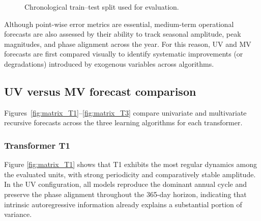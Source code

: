 \begin{figure}[!h]
\centering
\begin{subfigure}[t]{\columnwidth}
    \centering
    
\end{subfigure}\par\vspace{0.15cm}
\begin{subfigure}[t]{\columnwidth}
    \centering
    
\end{subfigure}\par\vspace{0.15cm}
\begin{subfigure}[t]{\columnwidth}
    \centering
    
\end{subfigure}
\caption{Chronological train--test split used for evaluation.}
\label{fig:split_all}
\end{figure}

Although point-wise error metrics are essential, medium-term operational forecasts are also assessed by their ability to track seasonal amplitude, peak magnitudes, and phase alignment across the year. For this reason, UV and MV forecasts are first compared visually to identify systematic improvements (or degradations) introduced by exogenous variables across algorithms.

\subsection{UV versus MV forecast comparison}
\label{subsec:results_uv_mv_visual}

Figures~\ref{fig:matrix_T1}--\ref{fig:matrix_T3} compare univariate and multivariate recursive forecasts across the three learning algorithms for each transformer.

\subsubsection{Transformer T1}
Figure \ref{fig:matrix_T1} shows that T1 exhibits the most regular dynamics among the evaluated units, with strong periodicity and comparatively stable amplitude. In the UV configuration, all models reproduce the dominant annual cycle and preserve the phase alignment throughout the 365-day horizon, indicating that intrinsic autoregressive information already explains a substantial portion of variance. 

